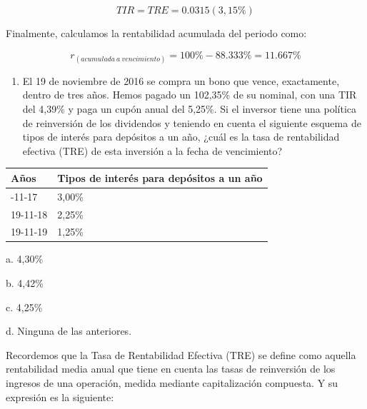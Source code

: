 \documentclass[
  letterpaper,
  DIV=11,
  numbers=noendperiod]{scrreprt}
\providecommand{\tightlist}{%
  \setlength{\itemsep}{0pt}\setlength{\parskip}{0pt}}\usepackage{longtable,booktabs,array}
\begin{document}
\begin{tcolorbox}
\begin{tcolorbox}[enhanced jigsaw, toprule=.15mm, left=2mm, arc=.35mm, breakable, bottomrule=.15mm, opacityback=0, rightrule=.15mm, leftrule=.75mm, colframe=quarto-callout-note-color-frame, colback=white]
\begin{minipage}[t]{\textwidth - 5.5mm}
\[TIR=TRE=0.0315(3,15\%)\]

Finalmente, calculamos la rentabilidad acumulada del periodo como:

\[r_{\left(acumulada\:a\:vencimiento\right)}=100\%-88.333\%=11.667\%\]

\end{minipage}%
\end{tcolorbox}

\begin{enumerate}
\def\labelenumi{\arabic{enumi}.}
\setcounter{enumi}{1}
\tightlist
\item
  El 19 de noviembre de 2016 se compra un bono que vence, exactamente,
  dentro de tres años. Hemos pagado un 102,35\% de su nominal, con una
  TIR del 4,39\% y paga un cupón anual del 5,25\%. Si el inversor tiene
  una política de reinversión de los dividendos y teniendo en cuenta el
  siguiente esquema de tipos de interés para depósitos a un año, ¿cuál
  es la tasa de rentabilidad efectiva (TRE) de esta inversión a la fecha
  de vencimiento?
\end{enumerate}

\begin{longtable}[]{@{}ll@{}}
\toprule\noalign{}
Años & Tipos de interés para depósitos a un año \\
\midrule\noalign{}
\endhead
\bottomrule\noalign{}
\endlastfoot
19-11-17 & 3,00\% \\
19-11-18 & 2,25\% \\
19-11-19 & 1,25\% \\
\end{longtable}

a. 4,30\%

b. 4,42\%

c. 4,25\%

d. Ninguna de las anteriores.

\begin{tcolorbox}[enhanced jigsaw, toprule=.15mm, left=2mm, arc=.35mm, breakable, bottomrule=.15mm, opacityback=0, rightrule=.15mm, leftrule=.75mm, colframe=quarto-callout-note-color-frame, colback=white]
\begin{minipage}[t]{5.5mm}
\textcolor{quarto-callout-note-color}{\faInfo}
\end{minipage}%
\begin{minipage}[t]{\textwidth - 5.5mm}

Recordemos que la Tasa de Rentabilidad Efectiva (TRE) se define como
aquella rentabilidad media anual que tiene en cuenta las tasas de
reinversión de los ingresos de una operación, medida mediante
capitalización compuesta. Y su expresión es la siguiente:


\end{minipage}
\end{tcolorbox}
\end{tcolorbox}
\end{document}
